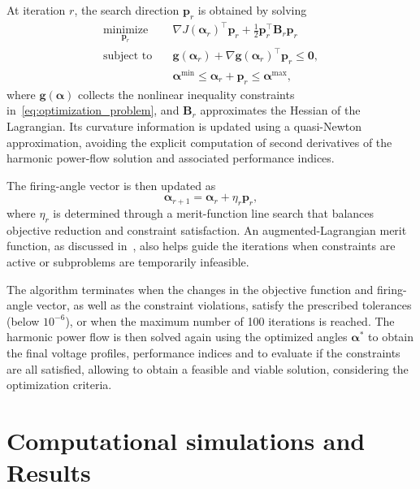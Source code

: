 \documentclass[journal]{IEEEtran}
\begin{document}
At iteration $r$, the search direction $\bm{p}_r$ is obtained by
solving
\begin{subequations}
\label{eq:sqp_subproblem}
\begin{align}
    \underset{\bm{p}_r}{\operatorname{minimize}}\quad
    &\nabla J(\bm{\alpha}_r)^{\top}\bm{p}_r+
    \frac{1}{2}\bm{p}_r^{\top}\bm{B}_r\bm{p}_r\\
    \text{subject to}\quad
    &\bm{g}(\bm{\alpha}_r)+
    \nabla\bm{g}(\bm{\alpha}_r)^{\top}\bm{p}_r\leq\bm{0},\\
    &\bm{\alpha}^{\min}\leq\bm{\alpha}_r+\bm{p}_r
    \leq\bm{\alpha}^{\max},
\end{align}
\end{subequations}
where $\bm{g}(\bm{\alpha})$ collects the nonlinear inequality
constraints in~\eqref{eq:optimization_problem}, and $\bm{B}_r$
approximates the Hessian of the Lagrangian. Its curvature
information is updated using a quasi-Newton approximation,
avoiding the explicit computation of second derivatives of the
harmonic power-flow solution and associated performance indices.

The firing-angle vector is then updated as
\begin{equation}
    \bm{\alpha}_{r+1}=\bm{\alpha}_r+\eta_r\bm{p}_r,
    \label{eq:sqp_update}
\end{equation}
where $\eta_r$ is determined through a merit-function line search
that balances objective reduction and constraint satisfaction.
An augmented-Lagrangian merit function, as discussed
in~\cite{Gill2005SNOPT}, also helps guide the iterations when
constraints are active or subproblems are temporarily infeasible.

The algorithm terminates when the changes in the objective
function and firing-angle vector, as well as the constraint
violations, satisfy the prescribed tolerances (below $10^{-6}$),
or when the maximum number of 100 iterations is reached. The harmonic
power flow \cite{variz2006three} is then solved again using the optimized angles
$\bm{\alpha}^{*}$ to obtain the final voltage profiles,
performance indices and to evaluate if the constraints are all satisfied, allowing to obtain a feasible and viable solution, considering the optimization criteria.


\section{Computational simulations and Results}
\label{sec:results}
\end{document}
